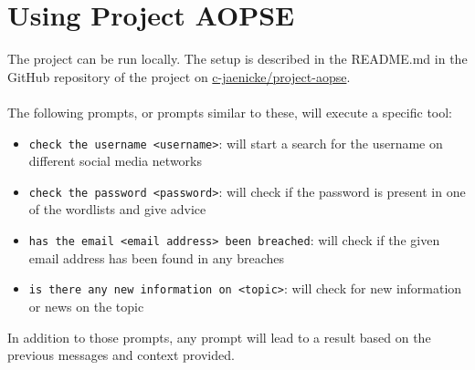 \documentclass[
    a4paper,
    pagesize,
	pdftex,
    12pt,
]{scrartcl}
\begin{document}
\section{Using Project AOPSE}
The project can be run locally. The setup is described in the README.md in the GitHub repository of the project on \hyperlink{https://github.com/c-jaenicke/project-aopse}{c-jaenicke/project-aopse}.
\\ \\
The following prompts, or prompts similar to these, will execute a specific tool:
\begin{itemize}
	\item \lstinline[breaklines]|check the username <username>|: will start a search for the username on different social media networks
	\item \lstinline[breaklines]|check the password <password>|: will check if the password is present in one of the wordlists and give advice
	\item \lstinline[breaklines]|has the email <email address> been breached|: will check if the given email address has been found in any breaches
	\item \lstinline[breaklines]|is there any new information on <topic>|: will check for new information or news on the topic
\end{itemize}
In addition to those prompts, any prompt will lead to a result based on the previous messages and context provided.
\end{document}
